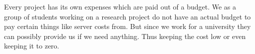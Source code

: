 \documentclass[a4paper]{article}
\begin{document}
Every project has its own expenses which are paid out of a budget. We as a group of students working on a research project do not have an actual budget to pay certain things like server costs from. But since we work for a university they can possibly provide us if we need anything. Thus keeping the cost low or even keeping it to zero.


\clearpage


\end{document}

